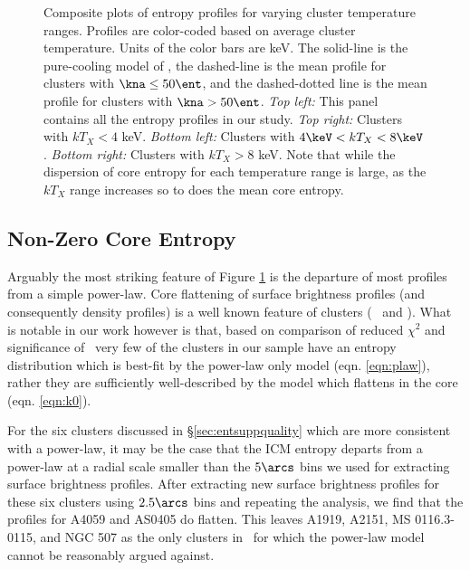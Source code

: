 \begin{center}
\begin{figure}[htp]
    \caption[Montage of entropy profiles for varying cuts in cluster
      temperature.]{Composite plots of entropy profiles for varying
      cluster temperature ranges. Profiles are color-coded based on
      average cluster temperature. Units of the color bars are
      keV. The solid-line is the pure-cooling model of
      \cite{voitbryan}, the dashed-line is the mean profile for
      clusters with $\kna \le 50 \ent$, and the dashed-dotted line is
      the mean profile for clusters with $\kna > 50 \ent$. {\it{Top
          left:}} This panel contains all the entropy profiles in our
      study. {\it{Top right:}} Clusters with $kT_X < 4$
      keV. {\it{Bottom left:}} Clusters with $4\keV < kT_X <
      8\keV$. {\it{Bottom right:}} Clusters with $kT_X > 8$ keV. Note
      that while the dispersion of core entropy for each temperature
      range is large, as the $kT_X$ range increases so to does the
      mean core entropy.}
    \label{fig:splots}
  \end{figure}
\end{center}

\subsection{Non-Zero Core Entropy}
\label{sec:entsuppnonzerok0}

Arguably the most striking feature of Figure \ref{fig:splots} is the
departure of most profiles from a simple power-law. Core flattening of
surface brightness profiles (and consequently density profiles) is a
well known feature of clusters (\eg\ \citealt{1999ApJ...517..627M} and
\citealt{2000MNRAS.318..715X}). What is notable in our work however is
that, based on comparison of reduced $\chi^2$ and significance of
\kna\, very few of the clusters in our sample have an entropy
distribution which is best-fit by the power-law only model
(eqn. \ref{eqn:plaw}), rather they are sufficiently well-described by
the model which flattens in the core (eqn. \ref{eqn:k0}).

For the six clusters discussed in \S\ref{sec:entsuppquality} which are more
consistent with a power-law, it may be the case that the ICM entropy
departs from a power-law at a radial scale smaller than the $5\arcs$
bins we used for extracting surface brightness profiles. After
extracting new surface brightness profiles for these six clusters
using $2.5\arcs$ bins and repeating the analysis, we find that the
profiles for A4059 and AS0405 do flatten. This leaves A1919, A2151, MS
0116.3-0115, and NGC 507 as the only clusters in \accept\ for which
the power-law model cannot be reasonably argued against.

